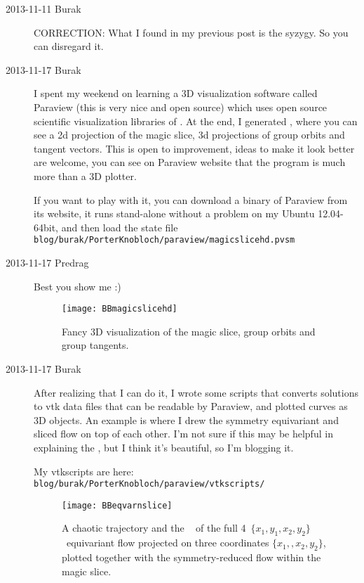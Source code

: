 \begin{description}
\item[2013-11-11 Burak] CORRECTION: What I found in my previous post is the syzygy.
So you can disregard it.

\item[2013-11-17 Burak] I spent my weekend on learning a 3D visualization
software called  {Paraview} (this is very
nice and open source) which uses open source scientific visualization libraries
of . At the end, I generated
, where you can see a 2d projection of the magic slice,
3d projections of group orbits and tangent vectors. This is open to improvement,
ideas to make it look better are welcome, you can see on Paraview website
that the program is much more than a 3D plotter.

If you want to play with it, you can download a binary of Paraview from its website,
it runs stand-alone without a problem on my Ubuntu 12.04-64bit, and then load
the state file
\\
\texttt{blog/burak/PorterKnobloch/paraview/magicslicehd.pvsm}
\item[2013-11-17 Predrag] Best you show me :)

\begin{figure}%
\centering
  \texttt{[image: BBmagicslicehd]}
\caption{Fancy 3D visualization of the magic slice, group orbits and group tangents.}
\label{fig:BBmagicslicehd}
\end{figure}

\item[2013-11-17 Burak]
After realizing that I can do it, I wrote some scripts that converts solutions
to vtk data files that can be readable by Paraview, and plotted curves as 3D
objects. An example is  where I drew the symmetry
equivariant and sliced flow on top of each other. I'm not sure if this may be
helpful in explaining the \mslices, but I think it's beautiful, so I'm blogging it.

My vtkscripts are here:
\\
\texttt{blog/burak/PorterKnobloch/paraview/vtkscripts/}

\begin{figure}%
\centering
  \texttt{[image: BBeqvarnslice]}
\caption{A chaotic trajectory and the \reqv\  of
the full 4\dmn\ $\{x_1, y_1 ,x_2, y_2\}$ \statesp\ equivariant flow
projected on three coordinates
$\{x_1, ,x_2, y_2\}$, plotted together
with the symmetry-reduced flow
within the magic slice.}
\label{fig:BBeqvarnslice}
\end{figure}


\end{description}
